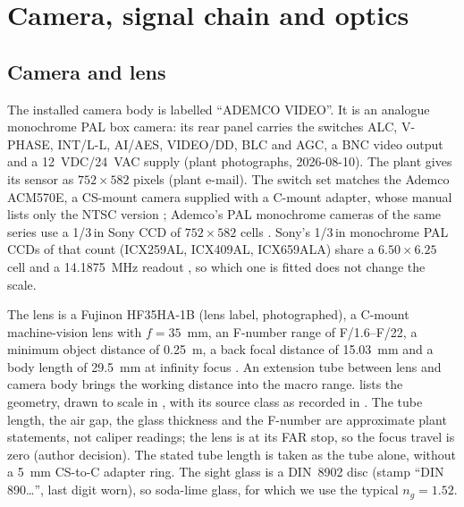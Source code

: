 \section{Camera, signal chain and optics}\label{app:optics}

\subsection{Camera and lens}\label{sec:camera}

The installed camera body is labelled ``ADEMCO VIDEO''. It is an analogue monochrome PAL box camera: its rear panel
carries the switches ALC, V-PHASE, INT/L-L, AI/AES, VIDEO/DD, BLC and AGC, a BNC video output and a 12~VDC/24~VAC
supply (plant photographs, 2026-08-10). The plant gives its sensor as $752 \times 582$ pixels (plant e-mail). The
switch set matches the Ademco ACM570E, a CS-mount camera supplied with a C-mount adapter, whose manual lists only the
NTSC version \citep{AdemcoACM380E}; Ademco's PAL monochrome cameras of the same series use a 1/3\,in Sony CCD of
$752 \times 582$ cells \citep{AdemcoACM574TP}. Sony's 1/3\,in monochrome PAL CCDs of that count (ICX259AL, ICX409AL,
ICX659ALA) share a $6.50 \times 6.25$~\um{} cell and a 14.1875~MHz readout \citep{OxfordSonyCCD}, so which one is
fitted does not change the scale.

The lens is a Fujinon HF35HA-1B (lens label, photographed), a C-mount machine-vision lens with $f = 35$~mm, an
F-number range of F/1.6--F/22, a minimum object distance of 0.25~m, a back focal distance of 15.03~mm and a body
length of 29.5~mm at infinity focus \citep{FujinonHF35HA1B}. An extension tube between lens and camera body brings the
working distance into the macro range.  lists the geometry, drawn to scale in , with its source class as recorded in
. The tube length, the air gap, the glass thickness and the F-number are approximate
plant statements, not caliper readings; the lens is at its FAR stop, so the focus travel is zero (author decision). The stated tube length is taken as
the tube alone, without a 5~mm CS-to-C adapter ring. The sight glass is a DIN~8902 disc \citep{DIN8902} (stamp ``DIN 890\ldots'', last digit worn), so soda-lime
glass, for which we use the typical $n_g = 1.52$.

